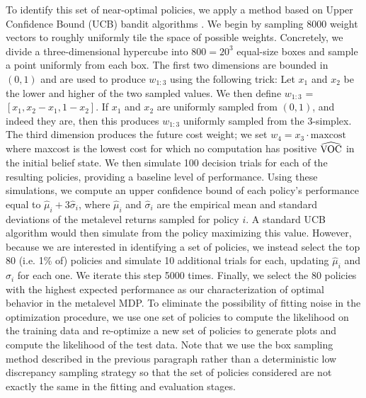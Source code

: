 To identify this set of near-optimal policies, we apply a method based on Upper Confidence Bound (UCB) bandit algorithms \citep{auer2002finite}.  We begin by sampling 8000 weight vectors to roughly uniformly tile the space of possible weights. Concretely, we divide a three-dimensional hypercube into $800= 20^3$ equal-size boxes and sample a point uniformly from each box. The first two dimensions are bounded in $(0, 1)$ and are used to produce $w_{1:3}$ using the following trick: Let $x_1$ and $x_2$ be the lower and higher of the two sampled values. We then define $w_{1:3}$ = $[x_1, x_2 - x_1, 1 - x_2]$. If $x_1$ and $x_2$ are uniformly sampled from $(0, 1)$, and indeed they are, then this produces $w_{1:3}$ uniformly sampled from the 3-simplex. The third dimension produces the future cost weight; we set $w_4 = x_3 \cdot \mathrm{maxcost}$ where maxcost is the lowest cost for which no computation has positive $\widehat{\text{VOC}}$ in the initial belief state. We then simulate 100 decision trials for each of the resulting policies, providing a baseline level of performance. Using these simulations, we compute an upper confidence bound of each policy's performance equal to $\hat{\mu}_i + 3\hat{\sigma}_i$, where $\hat{\mu}_i$ and $\hat{\sigma}_i$ are the empirical mean and standard deviations of the metalevel returns sampled for policy $i$. A standard UCB algorithm would then simulate from the policy maximizing this value. However, because we are interested in identifying a set of policies, we instead select the top 80 (i.e. 1\% of) policies and simulate 10 additional trials for each, updating $\hat{\mu}_i$ and $\hat{\sigma}_i$ for each one. We iterate this step 5000 times. Finally, we select the 80 policies with the highest expected performance as our characterization of optimal behavior in the metalevel MDP. To eliminate the possibility of fitting noise in the optimization procedure, we use one set of policies to compute the likelihood on the training data and re-optimize a new set of policies to generate plots and compute the likelihood of the test data. Note that we use the box sampling method described in the previous paragraph rather than a deterministic low discrepancy sampling strategy \citep{sobol1967distribution} so that the set of policies considered are not exactly the same in the fitting and evaluation stages.

